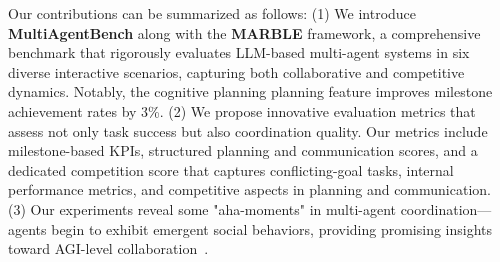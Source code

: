 


Our contributions can be summarized as follows:
(1) We introduce \textbf{MultiAgentBench} along with the \textbf{MARBLE} framework, a comprehensive benchmark that rigorously evaluates LLM-based multi-agent systems in six diverse interactive scenarios, capturing both collaborative and competitive dynamics. Notably, the cognitive planning planning feature improves milestone achievement rates by 3\%.
(2) We propose innovative evaluation metrics that assess not only task success but also coordination quality. Our metrics include milestone-based KPIs, structured planning and communication scores, and a dedicated competition score that captures conflicting-goal tasks, internal performance metrics, and competitive aspects in planning and communication.
(3) Our experiments reveal some "aha-moments" in multi-agent coordination—agents begin to exhibit emergent social behaviors, providing promising insights toward AGI-level collaboration~\citep{feng2024how}. 




